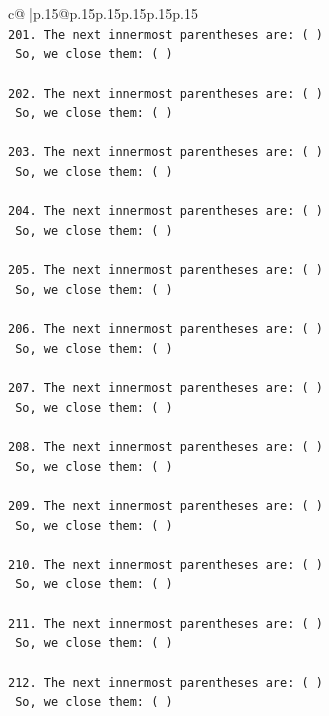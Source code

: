 \documentclass{article}
\begin{document}
{\begin{supertabular}{c@{$\;$}|p{.15\linewidth}@{}p{.15\linewidth}p{.15\linewidth}p{.15\linewidth}p{.15\linewidth}p{.15\linewidth}}
{{{\\ 
\texttt{201. The next innermost parentheses are: ( ) } \\
\texttt{    So, we close them: ( ) } \\
\\ 
\texttt{202. The next innermost parentheses are: ( ) } \\
\texttt{    So, we close them: ( ) } \\
\\ 
\texttt{203. The next innermost parentheses are: ( ) } \\
\texttt{    So, we close them: ( ) } \\
\\ 
\texttt{204. The next innermost parentheses are: ( ) } \\
\texttt{    So, we close them: ( ) } \\
\\ 
\texttt{205. The next innermost parentheses are: ( ) } \\
\texttt{    So, we close them: ( ) } \\
\\ 
\texttt{206. The next innermost parentheses are: ( ) } \\
\texttt{    So, we close them: ( ) } \\
\\ 
\texttt{207. The next innermost parentheses are: ( ) } \\
\texttt{    So, we close them: ( ) } \\
\\ 
\texttt{208. The next innermost parentheses are: ( ) } \\
\texttt{    So, we close them: ( ) } \\
\\ 
\texttt{209. The next innermost parentheses are: ( ) } \\
\texttt{    So, we close them: ( ) } \\
\\ 
\texttt{210. The next innermost parentheses are: ( ) } \\
\texttt{    So, we close them: ( ) } \\
\\ 
\texttt{211. The next innermost parentheses are: ( ) } \\
\texttt{    So, we close them: ( ) } \\
\\ 
\texttt{212. The next innermost parentheses are: ( ) } \\
\texttt{    So, we close them: ( ) } \\
}}}
\end{supertabular}}
\end{document}
